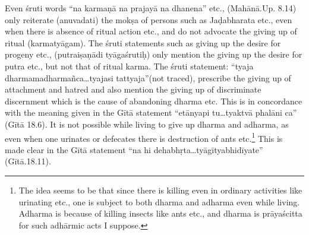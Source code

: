 Even śruti words “na karmaṇā na prajayā na dhanena” etc., (Mahānā.Up. 8.14) only reiterate (anuvadati)  the mokṣa of persons such as Jaḍabharata etc., even when there is absence of ritual action etc., and do not advocate the giving up of ritual (karmatyāgam). The śruti statements such as giving up the desire for progeny etc., (putraiṣaṇādi tyāgaśrutiḥ) only mention the giving up the desire for putra etc., but not that of ritual karma. The śruti statement: “tyaja dharmamadharmañca…tyajasi tattyaja”(not traced), prescribe the giving up of attachment and hatred and also mention the giving up of discriminate discernment which is the cause of abandoning dharma etc. This is in concordance with the meaning given in the Gītā statement “etānyapi tu…tyaktvā phalāni ca” (Gītā 18.6). It is not possible while living to give up dharma and adharma, as even when one urinates or defecates there is destruction of ants etc.\footnote{The idea seems to be that since there is killing even in ordinary activities like urinating etc., one is subject to both dharma and adharma even while living. Adharma  is because of killing insects like ants etc., and dharma is prāyaścitta for such adhārmic acts I suppose. } This is made clear in the Gītā statement “na hi dehabhṛta…tyāgītyabhidīyate” (Gītā.18.11).


